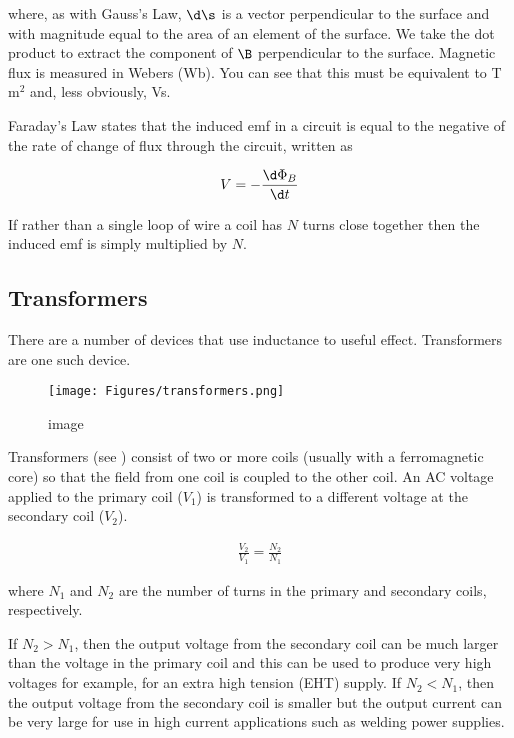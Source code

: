 \documentclass[
]{book}
\theoremstyle{definition}
\theoremstyle{definition}
\theoremstyle{definition}
\theoremstyle{definition}
\theoremstyle{remark}
\begin{document}
where, as with Gauss's Law, \(\d \s\) is a vector perpendicular to the
surface and with magnitude equal to the area of an element of the
surface. We take the dot product to extract the component of \(\B\)
perpendicular to the surface. Magnetic flux is measured in Webers (Wb).
You can see that this must be equivalent to T m\(^2\) and, less obviously,
Vs.

Faraday's Law states that the induced emf in a circuit is equal to the
negative of the rate of change of flux through the circuit, written as

\[\begin{aligned}
V = - \frac{\d \Phi_B}{\d t}
\end{aligned}\]

If rather than a single loop of wire a coil has \(N\) turns close together
then the induced emf is simply multiplied by \(N\).

\hypertarget{transformers}{%
\subsection{Transformers}\label{transformers}}

There are a number of devices that use inductance to useful effect.
Transformers are one such device.

\begin{figure}
\centering
\texttt{[image: Figures/transformers.png]}
\caption{image}
\end{figure}

Transformers (see ) consist of two or more coils (usually with a
ferromagnetic core) so that the field from one coil is coupled to the
other coil. An AC voltage applied to the primary coil (\(V_1\)) is
transformed to a different voltage at the secondary coil (\(V_2\)).

\[\begin{aligned}
\frac{V_2}{V_1} = \frac{N_2}{N_1}
\end{aligned}\]

where \(N_1\) and \(N_2\) are the number of turns in the primary and
secondary coils, respectively.

If \(N_2 > N_1\), then the output voltage from the secondary coil can be
much larger than the voltage in the primary coil and this can be used to
produce very high voltages for example, for an extra high tension (EHT)
supply. If \(N_2 < N_1\), then the output voltage from the secondary coil
is smaller but the output current can be very large for use in high
current applications such as welding power supplies.
\end{document}
